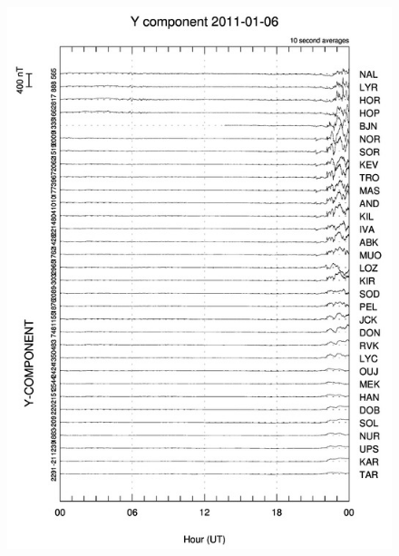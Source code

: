 \documentclass[norsk,a4paper,11pt]{article}
\begin{document}
\begin{multicols}{2}
\begin{figure}[H]
	\includegraphics[scale = 0.9]{Figures/Y_gram.jpg}

\end{figure}
\end{multicols}
\end{document}

